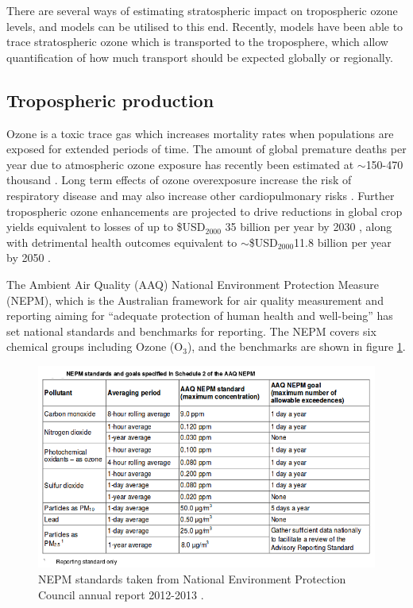     There are several ways of estimating stratospheric impact on tropospheric ozone levels, and models can be utilised to this end.
    Recently, models have been able to trace stratospheric ozone which is transported to the troposphere, which allow quantification of how much transport should be expected globally or regionally.
    

  \subsection{Tropospheric production}
  
    Ozone is a toxic trace gas which increases mortality rates when populations are exposed for extended periods of time.
    The amount of global premature deaths per year due to atmospheric ozone exposure has recently been estimated at $\sim$150-470 thousand \citep{Silva2013, Lelieveld2015}.
    Long term effects of ozone overexposure increase the risk of respiratory disease and may also increase other cardiopulmonary risks \citep{Jerrett2009}.
    Further tropospheric ozone enhancements are projected to drive reductions in global crop yields equivalent to losses of up to \$USD$_{2000}$ 35 billion per year by 2030 \citep{Avnery2011}, along with detrimental health outcomes equivalent to $\sim$\$USD$_{2000}$11.8 billion per year by 2050 \citep{Selin2009}.

    The Ambient Air Quality (AAQ) National Environment Protection Measure (NEPM), which is the Australian framework for air quality measurement and reporting aiming for ``adequate protection of human health and well-being'' has set national standards and benchmarks for reporting. The NEPM covers six chemical groups including Ozone (O$_3$), and the benchmarks are shown in figure \ref{ch1:fig:nepm}.

    \begin{figure}[!htbp]
      \includegraphics[width=\textwidth]{Figures/NEPMStandards.png}
      \caption{ NEPM standards taken from National Environment Protection Council annual report 2012-2013 \citep{nepc_annuals}. }
      \label{ch1:fig:nepm}
    \end{figure}
    
